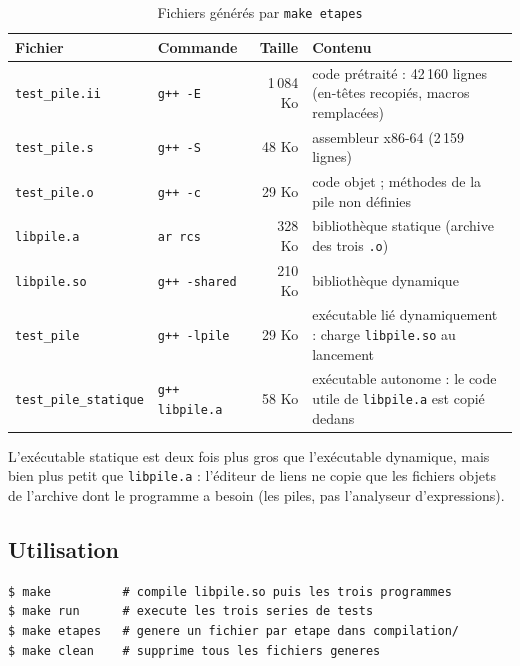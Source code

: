 \documentclass[11pt,a4paper]{article}
\newcommand{\code}[1]{\texttt{#1}}
\begin{document}
\begin{table}[H]
\centering
\small
\begin{tabularx}{\linewidth}{l l r >{\raggedright\arraybackslash}X}
  \toprule
  \textbf{Fichier} & \textbf{Commande} & \textbf{Taille} & \textbf{Contenu} \\
  \midrule
  \code{test\_pile.ii} & \code{g++ -E} & 1\,084 Ko & code prétraité : 42\,160 lignes
      (en-têtes recopiés, macros remplacées) \\
  \code{test\_pile.s} & \code{g++ -S} & 48 Ko & assembleur x86-64 (2\,159 lignes) \\
  \code{test\_pile.o} & \code{g++ -c} & 29 Ko & code objet ; méthodes de la pile
      non définies \\
  \code{libpile.a} & \code{ar rcs} & 328 Ko & bibliothèque statique (archive des
      trois \code{.o}) \\
  \code{libpile.so} & \code{g++ -shared} & 210 Ko & bibliothèque dynamique \\
  \code{test\_pile} & \code{g++ -lpile} & 29 Ko & exécutable lié dynamiquement :
      charge \code{libpile.so} au lancement \\
  \code{test\_pile\_statique} & \code{g++ libpile.a} & 58 Ko & exécutable autonome :
      le code utile de \code{libpile.a} est copié dedans \\
  \bottomrule
\end{tabularx}
\caption{Fichiers générés par \code{make etapes}}
\end{table}

L'exécutable statique est deux fois plus gros que l'exécutable dynamique,
mais bien plus petit que \code{libpile.a} : l'éditeur de liens ne copie que
les fichiers objets de l'archive dont le programme a besoin (les piles, pas
l'analyseur d'expressions).

\subsection{Utilisation}

\begin{lstlisting}[style=sortie]
$ make          # compile libpile.so puis les trois programmes
$ make run      # execute les trois series de tests
$ make etapes   # genere un fichier par etape dans compilation/
$ make clean    # supprime tous les fichiers generes
\end{lstlisting}
\end{document}
